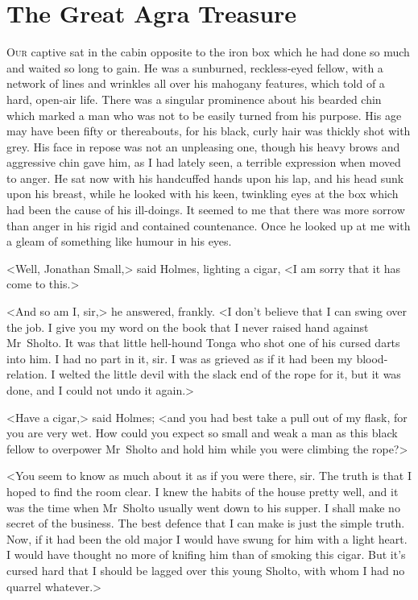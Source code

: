 \chapter{The Great Agra Treasure}
\lettrine{O}{ur} captive sat in the cabin opposite to the iron box which he had done so much and waited so long to gain. He was a sunburned, reckless-eyed fellow, with a network of lines and wrinkles all over his mahogany features, which told of a hard, open-air life. There was a singular prominence about his bearded chin which marked a man who was not to be easily turned from his purpose. His age may have been fifty or thereabouts, for his black, curly hair was thickly shot with grey. His face in repose was not an unpleasing one, though his heavy brows and aggressive chin gave him, as I had lately seen, a terrible expression when moved to anger. He sat now with his handcuffed hands upon his lap, and his head sunk upon his breast, while he looked with his keen, twinkling eyes at the box which had been the cause of his ill-doings. It seemed to me that there was more sorrow than anger in his rigid and contained countenance. Once he looked up at me with a gleam of something like humour in his eyes.

<Well, Jonathan Small,> said Holmes, lighting a cigar, <I am sorry that it has come to this.>

<And so am I, sir,> he answered, frankly. <I don't believe that I can swing over the job. I give you my word on the book that I never raised hand against Mr~Sholto. It was that little hell-hound Tonga who shot one of his cursed darts into him. I had no part in it, sir. I was as grieved as if it had been my blood-relation. I welted the little devil with the slack end of the rope for it, but it was done, and I could not undo it again.>

<Have a cigar,> said Holmes; <and you had best take a pull out of my flask, for you are very wet. How could you expect so small and weak a man as this black fellow to overpower Mr~Sholto and hold him while you were climbing the rope?>

<You seem to know as much about it as if you were there, sir. The truth is that I hoped to find the room clear. I knew the habits of the house pretty well, and it was the time when Mr~Sholto usually went down to his supper. I shall make no secret of the business. The best defence that I can make is just the simple truth. Now, if it had been the old major I would have swung for him with a light heart. I would have thought no more of knifing him than of smoking this cigar. But it's cursed hard that I should be lagged over this young Sholto, with whom I had no quarrel whatever.>

